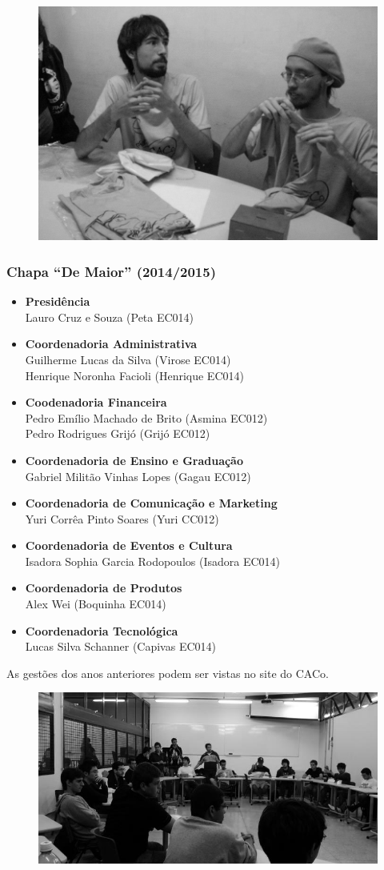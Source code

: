 \begin{figure}[H]
    \centering
    \includegraphics[width=.45\textwidth]{img/alem_da_graduacao/caco_eleicao.jpg}
\end{figure}

\subsubsection*{Chapa ``De Maior'' (2014/2015)}

\begin{itemize}
    \item   \textbf{Presidência}
        \\Lauro Cruz e Souza (Peta EC014)

    \item   \textbf{Coordenadoria Administrativa}
        \\Guilherme Lucas da Silva (Virose EC014)
        \\Henrique Noronha Facioli (Henrique EC014)

    \item   \textbf{Coodenadoria Financeira}
        \\Pedro Emílio Machado de Brito (Asmina EC012)
        \\Pedro Rodrigues Grijó (Grijó EC012)

    \item   \textbf{Coordenadoria de Ensino e Graduação}
        \\Gabriel Militão Vinhas Lopes (Gagau EC012)

    \item   \textbf{Coordenadoria de Comunicação e Marketing}
        \\Yuri Corrêa Pinto Soares (Yuri CC012)
        
    \item   \textbf{Coordenadoria de Eventos e Cultura}
        \\Isadora Sophia Garcia Rodopoulos (Isadora EC014)

    \item   \textbf{Coordenadoria de Produtos}
        \\Alex Wei (Boquinha EC014)

    \item    \textbf{Coordenadoria Tecnológica}
        \\Lucas Silva Schanner (Capivas EC014)
\end{itemize}

As gestões dos anos anteriores podem ser vistas no site do CACo.

\begin{figure}[H]
    \centering
    \includegraphics[width=.45\textwidth]{img/alem_da_graduacao/caco_pipocaco.jpg}
\end{figure}
